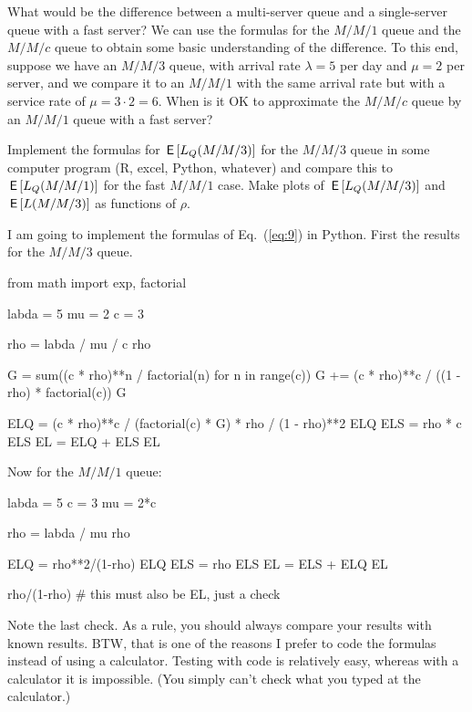 \begin{exercise}\label{ex:27}
  What would be the difference between a multi-server queue and a
  single-server queue with a fast server? We can use the formulas for
  the $M/M/1$ queue and the $M/M/c$ queue to obtain some basic
  understanding of the difference. To this end, suppose we have an
  $M/M/3$ queue, with arrival rate $\lambda = 5$ per day and $\mu=2$
  per server, and we compare it to an $M/M/1$ with the same arrival
  rate but with a service rate of $\mu = 3\cdot 2 = 6$. 
 When is it OK to approximate the $M/M/c$ queue by an $M/M/1$
    queue with a fast server?
    \begin{hint}
Implement the formulas for $\,\mathsf{E}\left[L_Q(M/M/3)\right]$ for the $M/M/3$ queue in
  some computer program (R, excel, Python, whatever) and compare this
  to $\,\mathsf{E}\left[L_Q(M/M/1)\right]$ for the fast $M/M/1$ case.  Make plots of
  $\,\mathsf{E}\left[L_Q(M/M/3)\right]$ and $\,\mathsf{E}\left[L(M/M/3)\right]$ as functions of $\rho$.
    \end{hint}

  \begin{solution}
I am going to implement the formulas of Eq.~(\ref{eq:9}) in Python. First the results for the $M/M/3$ queue.

\begin{pyconsole}
from math import exp, factorial

labda = 5
mu = 2
c = 3

rho = labda / mu / c
rho

G = sum((c * rho)**n / factorial(n) for n in range(c))
G += (c * rho)**c / ((1 - rho) * factorial(c))
G

ELQ = (c * rho)**c / (factorial(c) * G) * rho / (1 - rho)**2
ELQ
ELS = rho * c
ELS
EL = ELQ + ELS
EL
\end{pyconsole}

Now for the $M/M/1$ queue:

\begin{pyconsole}
labda = 5
c = 3
mu = 2*c

rho = labda / mu 
rho

ELQ = rho**2/(1-rho)
ELQ
ELS = rho
ELS
EL = ELS + ELQ
EL

rho/(1-rho) # this must also be EL, just a check
\end{pyconsole}

Note the last check. As a rule, you should always compare your results
with known results. BTW, that is one of the reasons I prefer to code
the formulas instead of using a calculator. Testing with code is
relatively easy, whereas with a calculator it is impossible. (You
simply can't check what you typed at the calculator.)


\end{solution}
\end{exercise}
